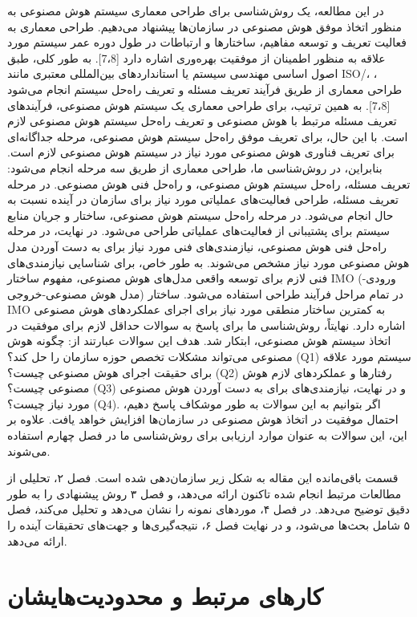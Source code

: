 \documentclass[a4paper,10pt]{article}
\begin{document}
        در این مطالعه، یک روش‌شناسی برای طراحی معماری سیستم هوش مصنوعی به منظور اتخاذ موفق هوش مصنوعی در سازمان‌ها پیشنهاد می‌دهیم. طراحی معماری به فعالیت تعریف و توسعه مفاهیم، ساختارها و ارتباطات در طول دوره عمر سیستم مورد علاقه به منظور اطمینان از موفقیت بهره‌وری اشاره دارد [7،8]. به طور کلی، طبق اصول اساسی مهندسی سیستم یا استانداردهای بین‌المللی معتبری مانند ISO/، ، طراحی معماری از طریق فرآیند تعریف مسئله و تعریف راه‌حل سیستم انجام می‌شود [7،8]. به همین ترتیب، برای طراحی معماری یک سیستم هوش مصنوعی، فرآیندهای تعریف مسئله مرتبط با هوش مصنوعی و تعریف راه‌حل سیستم هوش مصنوعی لازم است. با این حال، برای تعریف موفق راه‌حل سیستم هوش مصنوعی، مرحله جداگانه‌ای برای تعریف فناوری هوش مصنوعی مورد نیاز در سیستم هوش مصنوعی لازم است. بنابراین، در روش‌شناسی ما، طراحی معماری از طریق سه مرحله انجام می‌شود: تعریف مسئله، راه‌حل سیستم هوش مصنوعی، و راه‌حل فنی هوش مصنوعی. در مرحله تعریف مسئله، طراحی فعالیت‌های عملیاتی مورد نیاز برای سازمان در آینده نسبت به حال انجام می‌شود. در مرحله راه‌حل سیستم هوش مصنوعی، ساختار و جریان منابع سیستم برای پشتیبانی از فعالیت‌های عملیاتی طراحی می‌شود. در نهایت، در مرحله راه‌حل فنی هوش مصنوعی، نیازمندی‌های فنی مورد نیاز برای به دست آوردن مدل هوش مصنوعی مورد نیاز مشخص می‌شوند. به طور خاص، برای شناسایی نیازمندی‌های فنی لازم برای توسعه واقعی مدل‌های هوش مصنوعی، مفهوم ساختار IMO (ورودی-مدل هوش مصنوعی-خروجی) در تمام مراحل فرآیند طراحی استفاده می‌شود. ساختار IMO به کمترین ساختار منطقی مورد نیاز برای اجرای عملکردهای هوش مصنوعی اشاره دارد. نهایتاً، روش‌شناسی ما برای پاسخ به سوالات حداقل لازم برای موفقیت در اتخاذ سیستم هوش مصنوعی، ابتکار شد. هدف این سوالات عبارتند از: چگونه هوش مصنوعی می‌تواند مشکلات تخصص حوزه سازمان را حل کند؟ (Q1) سیستم مورد علاقه برای حقیقت اجرای هوش مصنوعی چیست؟ (Q2) رفتارها و عملکردهای لازم هوش مصنوعی چیست؟ (Q3) و در نهایت، نیازمندی‌های برای به دست آوردن هوش مصنوعی مورد نیاز چیست؟ (Q4). اگر بتوانیم به این سوالات به طور موشکاف پاسخ دهیم، احتمال موفقیت در اتخاذ هوش مصنوعی در سازمان‌ها افزایش خواهد یافت. علاوه بر این، این سوالات به عنوان موارد ارزیابی برای روش‌شناسی ما در فصل چهارم استفاده می‌شوند.

        قسمت باقی‌مانده این مقاله به شکل زیر سازمان‌دهی شده است. فصل ۲، تحلیلی از مطالعات مرتبط انجام شده تاکنون ارائه می‌دهد، و فصل ۳ روش پیشنهادی را به طور دقیق توضیح می‌دهد. در فصل ۴، موردهای نمونه را نشان می‌دهد و تحلیل می‌کند، فصل ۵ شامل بحث‌ها می‌شود، و در نهایت فصل ۶، نتیجه‌گیری‌ها و جهت‌های تحقیقات آینده را ارائه می‌دهد.

    \section{کارهای مرتبط و محدودیت‌هایشان}
\end{document}
